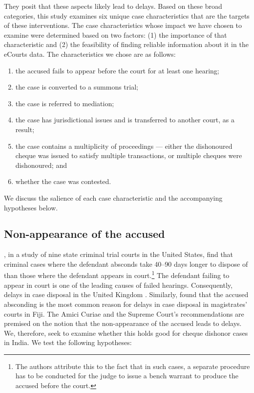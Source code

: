 \documentclass[12pt,a4paper]{article}
\begin{document}
	They posit that these aspects likely lead to delays. Based on these broad categories, this study examines six unique case characteristics that are the targets of these interventions. The case characteristics whose impact we have chosen to examine were determined based on two factors: (1) the importance of that characteristic and (2) the feasibility of finding reliable information about it in the eCourts data. The characteristics we chose are as follows:
	
	\begin{enumerate}
		\item the accused fails to appear before the court for at least one hearing;
		\item the case is converted to a summons trial;
		\item the case is referred to mediation;
		\item the case has jurisdictional issues and is transferred to another court, as a result;
		\item the case contains a multiplicity of proceedings --- either the dishonoured cheque was issued to satisfy multiple transactions, or multiple cheques were dishonoured; and
		\item whether the case was contested.
	\end{enumerate}
			
	We discuss the salience of each case characteristic and the accompanying hypotheses below.
		
		\subsection{Non-appearance of the accused} 
		\label{sec:non-appe-accus}
		
		\textcite{ostrom2000efficiency}, in a study of nine state criminal trial courts in the United States, find that criminal cases where the defendant absconds take 40--90 days longer to dispose of than those where the defendant appears in court.\footnote{The authors attribute this to the fact that in such cases, a separate procedure has to be conducted for the judge to issue a bench warrant to produce the accused before the court.} The defendant failing to appear in court is one of the leading causes of failed hearings. Consequently, delays in case disposal in the United Kingdom \autocite{crownProsecutionService2006_magistrateCourtEfficiency}. Similarly, \textcite{llangasinghe1988_fijiJudicialDelays} found that the accused absconding is the most common reason for delays in case disposal in magistrates' courts in Fiji. The Amici Curiae and the Supreme Court's recommendations are premised on the notion that the non-appearance of the accused leads to delays. We, therefore, seek to examine whether this holds good for cheque dishonor cases in India. We test the following hypotheses:
		
\end{document}
